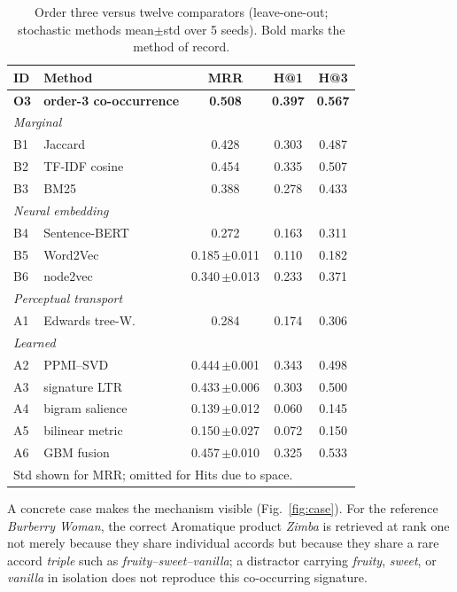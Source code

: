 \documentclass[conference]{IEEEtran}
\begin{document}
\begin{table}[t]
\caption{Order three versus twelve comparators (leave-one-out; stochastic methods
mean$\pm$std over 5 seeds). Bold marks the method of record.}
\begin{center}\footnotesize\setlength{\tabcolsep}{4pt}
\begin{tabular}{llccc}
\toprule
\textbf{ID} & \textbf{Method} & \textbf{MRR} & \textbf{H@1} & \textbf{H@3} \\
\midrule
\textbf{O3} & \textbf{order-3 co-occurrence} & \textbf{0.508} & \textbf{0.397} & \textbf{0.567} \\
\midrule
\multicolumn{5}{l}{\textit{Marginal}} \\
B1 & Jaccard            & 0.428 & 0.303 & 0.487 \\
B2 & TF-IDF cosine      & 0.454 & 0.335 & 0.507 \\
B3 & BM25               & 0.388 & 0.278 & 0.433 \\
\multicolumn{5}{l}{\textit{Neural embedding}} \\
B4 & Sentence-BERT      & 0.272 & 0.163 & 0.311 \\
B5 & Word2Vec           & 0.185{\scriptsize\,$\pm$0.011} & 0.110 & 0.182 \\
B6 & node2vec           & 0.340{\scriptsize\,$\pm$0.013} & 0.233 & 0.371 \\
\multicolumn{5}{l}{\textit{Perceptual transport}} \\
A1 & Edwards tree-W.\    & 0.284 & 0.174 & 0.306 \\
\multicolumn{5}{l}{\textit{Learned}} \\
A2 & PPMI--SVD          & 0.444{\scriptsize\,$\pm$0.001} & 0.343 & 0.498 \\
A3 & signature LTR      & 0.433{\scriptsize\,$\pm$0.006} & 0.303 & 0.500 \\
A4 & bigram salience    & 0.139{\scriptsize\,$\pm$0.012} & 0.060 & 0.145 \\
A5 & bilinear metric    & 0.150{\scriptsize\,$\pm$0.027} & 0.072 & 0.150 \\
A6 & GBM fusion         & 0.457{\scriptsize\,$\pm$0.010} & 0.325 & 0.533 \\
\bottomrule
\multicolumn{5}{l}{\scriptsize Std shown for MRR; omitted for Hits due to space.}
\end{tabular}
\label{tab:main}
\end{center}
\end{table}

A concrete case makes the mechanism visible (Fig.~\ref{fig:case}). For the reference
\textit{Burberry Woman}, the correct Aromatique product \textit{Zimba} is retrieved at rank
one not merely because they share individual accords but because they share a rare accord
\emph{triple} such as \textit{fruity--sweet--vanilla}; a distractor carrying \textit{fruity},
\textit{sweet}, or \textit{vanilla} in isolation does not reproduce this co-occurring
signature.
\end{document}
